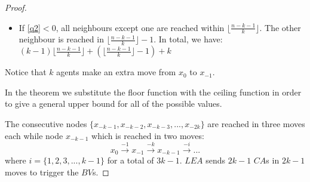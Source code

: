 \begin{proof}
\begin{enumerate}
\begin{itemize}
\item If \ref{q2}$< 0 $, all neighbours except one are reached within $\lfloor \frac {n-k-1}{k} \rfloor $. The other neighbour is reached in $\lfloor \frac {n-k-1}{k} \rfloor -1$. In total, we have: \\
$(k-1)\lfloor \frac {n-k-1}{k} \rfloor + (\lfloor \frac {n-k-1}{k} \rfloor -1)+k$
\end {itemize}
Notice that $k$ agents make an extra move from $x_{0}$ to $x_{-1}$.
\end{enumerate}
In the theorem we substitute the floor function with the ceiling function in order to give a general upper bound for all of the possible values.

The consecutive nodes $\{x_{-k-1},x_{-k-2},x_{-k-3},...,x_{-2k}\}$   are reached in three moves each while node $x_{-k-1}$ which is reached in two moves:
$$x_{0} \xrightarrow {-1} x_{-1} \xrightarrow {-k}  x_{-k-1} \xrightarrow {-i} ...$$ 
where $i=\{1,2,3,...,k-1\}$ for a total of $3k-1$. $LEA$ sends $2k-1$ $CA$s in $2k-1$ moves to trigger the $BV$s.
\end{proof}

\begin{comment}


\begin{theorem}\label{one-d-noloop}
The  algorithm  successfully disinfects a consecutive-chord ring from \bvs in a monotone synchronous way following  the one-direction greedy strategy. 
\end{theorem}
\begin{proof}
The {\em Exploring and Shadowing} phase successfully locates the original \bv as demonstrated with the previous topology. It also locates the \bv in a monotone way since the maximum possible number of shadows are created at the beginning and then synchronize their movements with the exploring team. The synchronicity of our system ensures monotonicity. 
The second phase, the {\em Surrounding and Eliminating} phase, uses the one-direction greedy strategy and is completely free of loops since this approach forces the $SA$s to move in one direction, avoiding the \bvs in the system since the agents have knowledge of $n$ and the number and locations of $BV$s. In the first stage of this approach, $SA$ checks the number of \bvs in the system, and then moves directly through $(\lambda=-k)$ or through $(\lambda=-1)$ and then $(\lambda=-k)$. In order to ensure optimality in terms of the number of required moves, the second stage uses the simple greedy strategy to ensure a minimal distance between the target and the current location of the $SA$.

\end{proof}
\end{comment}



